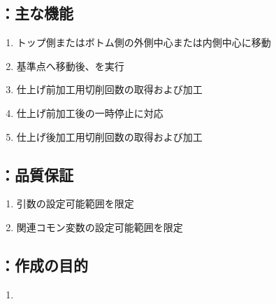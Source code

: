 \subsection{\KCurvedOutcutRLeft：主な機能}
\begin{enumerate}[label*=\sarrow]
\item トップ側またはボトム側の外側中心または内側中心に移動
\item 基準点へ移動後、\KOLeftFSZ を実行
\item 仕上げ前加工用切削回数の取得および加工
\item 仕上げ前加工後の一時停止\OpauseCheck に対応
\item 仕上げ後加工用切削回数の取得および加工
\end{enumerate}


\subsection{\KCurvedOutcutRLeft：品質保証}
\begin{enumerate}[label*=\sarrow]
\item {}引数の設定可能範囲を限定
\item 関連コモン変数の設定可能範囲を限定
\end{enumerate}



\clearpage


\subsection{\KKeywayConerLeft：作成の目的}
\begin{enumerate}[label*=\sarrow]
\item \KeywayMilling
\end{enumerate}


